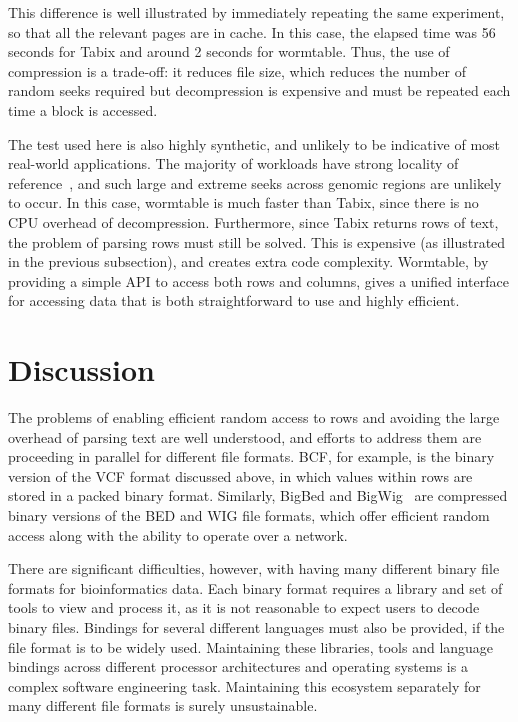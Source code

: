 \documentclass[10pt]{bmc_article}
\newenvironment{bmcformat}{\begin{raggedright}\baselineskip20pt\sloppy\setboolean{publ}{false}}{\end{raggedright}\baselineskip20pt\sloppy}
\begin{document}
\begin{bmcformat}
This difference is well illustrated by immediately repeating 
the same experiment, so that all the relevant pages are 
in cache. In this case, the elapsed time was 56 seconds for Tabix and around 
2 seconds for wormtable. Thus, the use of compression is a trade-off: 
it reduces file size, which reduces the number of random seeks 
required but decompression is expensive and must 
be repeated each time a block is accessed.

The test used here is also highly synthetic, and unlikely to be 
indicative of most real-world applications. The majority of 
workloads have strong locality of reference~\cite{d05}, 
and such large and extreme seeks across genomic regions 
are unlikely to occur. In this case, wormtable 
is  much faster than Tabix, since there
is no CPU overhead of decompression. Furthermore, since 
Tabix returns rows of text, the problem of parsing rows
must still be solved. This is expensive (as illustrated 
in the previous subsection), and creates extra code 
complexity. Wormtable, by providing a simple API to 
access both rows and columns, gives a 
unified interface for accessing data that is 
both straightforward to use and highly efficient.


\section*{Discussion}
The problems of enabling efficient random access to rows and 
avoiding the large overhead of parsing text are well understood, 
and efforts to address them are proceeding in parallel for 
different file formats. 
BCF, for example, is the binary version of the VCF format discussed 
above, in which values within rows are stored in a packed binary 
format.  Similarly, BigBed and 
BigWig~\cite{kzbhk10} are compressed binary versions of the BED 
and WIG file formats, which offer efficient random access along 
with the ability to operate over a network. 

There are significant difficulties,
however, with having many different binary file formats for bioinformatics 
data. Each binary format requires a library and set of tools to view 
and process it, as it is not reasonable to expect users to decode binary
files. Bindings for several different languages must also be provided, if 
the file format is to be widely used.
Maintaining these libraries, tools and language bindings across 
different processor architectures and operating systems
is a complex software engineering task. Maintaining this ecosystem 
separately for many different file formats is surely 
unsustainable.


\end{bmcformat}
\end{document}
